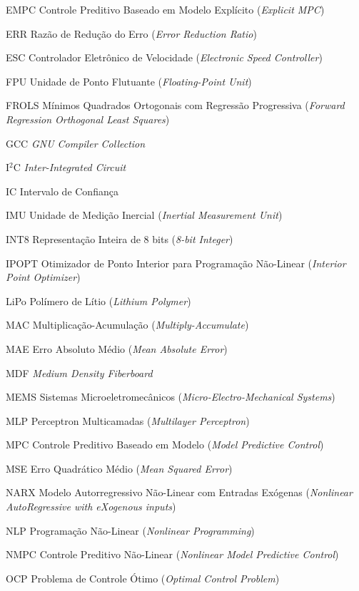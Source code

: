 \begin{siglas}
    \item[EMPC] Controle Preditivo Baseado em Modelo Explícito (\textit{Explicit MPC})
    \item[ERR] Razão de Redução do Erro (\textit{Error Reduction Ratio})
    \item[ESC] Controlador Eletrônico de Velocidade (\textit{Electronic Speed Controller})
    \item[FPU] Unidade de Ponto Flutuante (\textit{Floating-Point Unit})
    \item[FROLS] Mínimos Quadrados Ortogonais com Regressão Progressiva (\textit{Forward Regression Orthogonal Least Squares})
    \item[GCC] \textit{GNU Compiler Collection}
    \item[I$^2$C] \textit{Inter-Integrated Circuit}
    \item[IC] Intervalo de Confiança
    \item[IMU] Unidade de Medição Inercial (\textit{Inertial Measurement Unit})
    \item[INT8] Representação Inteira de 8 bits (\textit{8-bit Integer})
    \item[IPOPT] Otimizador de Ponto Interior para Programação Não-Linear (\textit{Interior Point Optimizer})
    \item[LiPo] Polímero de Lítio (\textit{Lithium Polymer})
    \item[MAC] Multiplicação-Acumulação (\textit{Multiply-Accumulate})
    \item[MAE] Erro Absoluto Médio (\textit{Mean Absolute Error})
    \item[MDF] \textit{Medium Density Fiberboard}
    \item[MEMS] Sistemas Microeletromecânicos (\textit{Micro-Electro-Mechanical Systems})
    \item[MLP] Perceptron Multicamadas (\textit{Multilayer Perceptron})
    \item[MPC] Controle Preditivo Baseado em Modelo (\textit{Model Predictive Control})
    \item[MSE] Erro Quadrático Médio (\textit{Mean Squared Error})
    \item[NARX] Modelo Autorregressivo Não-Linear com Entradas Exógenas (\textit{Nonlinear AutoRegressive with eXogenous inputs})
    \item[NLP] Programação Não-Linear (\textit{Nonlinear Programming})
    \item[NMPC] Controle Preditivo Não-Linear (\textit{Nonlinear Model Predictive Control})
    \item[OCP] Problema de Controle Ótimo (\textit{Optimal Control Problem})

\end{siglas}
